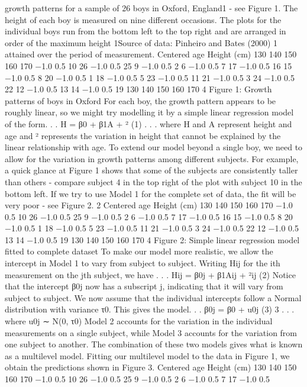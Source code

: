 growth patterns for a sample of 26 boys in Oxford, England1
- see Figure 1. The height
of each boy is measured on nine different occasions. The plots for the individual boys run
from the bottom left to the top right and are arranged in order of the maximum height
1Source of data: Pinheiro and Bates (2000)
1
attained over the period of measurement.
Centered age
Height (cm)
130
140
150
160
170
−1.0 0.5
10 26
−1.0 0.5
25 9
−1.0 0.5
2 6
−1.0 0.5
7 17
−1.0 0.5
16 15
−1.0 0.5
8 20
−1.0 0.5
1
18
−1.0 0.5
5 23
−1.0 0.5
11 21
−1.0 0.5
3 24
−1.0 0.5
22 12
−1.0 0.5
13 14
−1.0 0.5
19
130
140
150
160
170
4
Figure 1: Growth patterns of boys in Oxford
For each boy, the growth pattern appears to be roughly linear, so we might try modelling
it by a simple linear regression model of the form. . .
H = β0 + β1A + ² (1)
. . . where H and A represent height and age and ² represents the variation in height that
cannot be explained by the linear relationship with age.
To extend our model beyond a single boy, we need to allow for the variation in growth
patterns among different subjects. For example, a quick glance at Figure 1 shows that
some of the subjects are consistently taller than others - compare subject 4 in the top
right of the plot with subject 10 in the bottom left. If we try to use Model 1 for the
complete set of data, the fit will be very poor - see Figure 2.
2
Centered age
Height (cm)
130
140
150
160
170
−1.0 0.5
10 26
−1.0 0.5
25 9
−1.0 0.5
2 6
−1.0 0.5
7 17
−1.0 0.5
16 15
−1.0 0.5
8 20
−1.0 0.5
1
18
−1.0 0.5
5 23
−1.0 0.5
11 21
−1.0 0.5
3 24
−1.0 0.5
22 12
−1.0 0.5
13 14
−1.0 0.5
19
130
140
150
160
170
4
Figure 2: Simple linear regression model fitted to complete dataset
To make our model more realistic, we allow the intercept in Model 1 to vary from subject
to subject. Writing Hij for the ith measurement on the jth subject, we have . . .
Hij = β0j + β1Aij + ²ij (2)
Notice that the intercept β0j now has a subscript j, indicating that it will vary from
subject to subject.
We now assume that the individual intercepts follow a Normal distribution with variance
τ0. This gives the model. . .
β0j = β0 + u0j (3)
3
. . . where u0j ∼ N(0, τ0)
Model 2 accounts for the variation in the individual measurements on a single subject,
while Model 3 accounts for the variation from one subject to another. The combination
of these two models gives what is known as a multilevel model.
Fitting our multilevel model to the data in Figure 1, we obtain the predictions shown in
Figure 3.
Centered age
Height (cm)
130
140
150
160
170
−1.0 0.5
10 26
−1.0 0.5
25 9
−1.0 0.5
2 6
−1.0 0.5
7 17
−1.0 0.5
